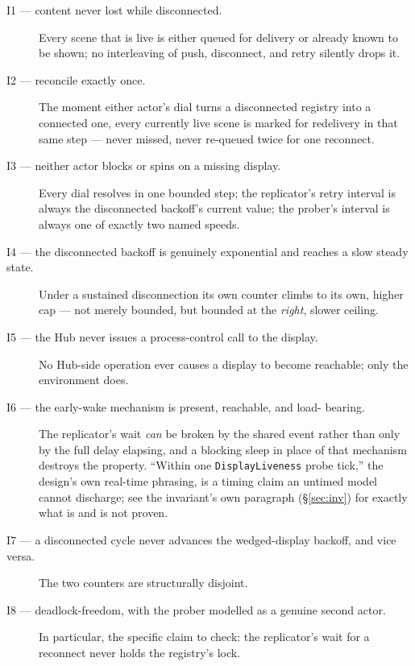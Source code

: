 \documentclass[a4paper,10pt,fleqn]{article}
\begin{document}
\begin{description}
  \item[I1 --- content never lost while disconnected.] Every scene that is
    live is either queued for delivery or already known to be shown; no
    interleaving of push, disconnect, and retry silently drops it.
  \item[I2 --- reconcile exactly once.] The moment either actor's dial
    turns a disconnected registry into a connected one, every currently
    live scene is marked for redelivery in that same step --- never missed,
    never re-queued twice for one reconnect.
  \item[I3 --- neither actor blocks or spins on a missing display.] Every
    dial resolves in one bounded step; the replicator's retry interval is
    always the disconnected backoff's current value; the prober's interval
    is always one of exactly two named speeds.
  \item[I4 --- the disconnected backoff is genuinely exponential and
    reaches a slow steady state.] Under a sustained disconnection its own
    counter climbs to its own, higher cap --- not merely bounded, but
    bounded at the \emph{right}, slower ceiling.
  \item[I5 --- the Hub never issues a process-control call to the
    display.] No Hub-side operation ever causes a display to become
    reachable; only the environment does.
  \item[I6 --- the early-wake mechanism is present, reachable, and load-
    bearing.] The replicator's wait \emph{can} be broken by the shared
    event rather than only by the full delay elapsing, and a blocking
    sleep in place of that mechanism destroys the property.  ``Within one
    \texttt{DisplayLiveness} probe tick,'' the design's own real-time
    phrasing, is a timing claim an untimed model cannot discharge; see the
    invariant's own paragraph (\S\ref{sec:inv}) for exactly what is and is
    not proven.
  \item[I7 --- a disconnected cycle never advances the wedged-display
    backoff, and vice versa.] The two counters are structurally disjoint.
  \item[I8 --- deadlock-freedom, with the prober modelled as a genuine
    second actor.] In particular, the specific claim to check: the
    replicator's wait for a reconnect never holds the registry's lock.
\end{description}

\end{document}
